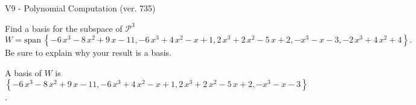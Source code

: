 \begin{exercise}
  \begin{exerciseTitle}V9 - Polynomial Computation (ver. 735)\end{exerciseTitle}
  \begin{exerciseStatement}
    Find a basis for the subspace of \(\mathcal{P}^3\) 
\[W=\mathrm{span}\ \left\{-6 \, x^{3} - 8 \, x^{2} + 9 \, x - 11 , -6 \, x^{3} + 4 \, x^{2} - x + 1 , 2 \, x^{3} + 2 \, x^{2} - 5 \, x + 2 , -x^{3} - x - 3 , -2 \, x^{3} + 4 \, x^{2} + 4\right\}.\]
 Be sure to explain why your result is a basis.


  \end{exerciseStatement}
  \begin{exerciseAnswer}
   A basis of \(W\) is  \(\left\{-6 \, x^{3} - 8 \, x^{2} + 9 \, x - 11 , -6 \, x^{3} + 4 \, x^{2} - x + 1 , 2 \, x^{3} + 2 \, x^{2} - 5 \, x + 2 , -x^{3} - x - 3\right\}\).
  


  \end{exerciseAnswer}
\end{exercise}